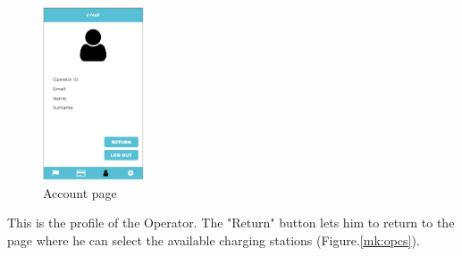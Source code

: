 \documentclass[../main.tex]{subfiles}
\begin{document}
\begin{figure}[!htb]
  \centering
  \begin{minipage}[b]{0.3\textwidth}
  \centering
    \includegraphics[width=30mm]{Mockups/mk_op_info.png}
    \caption{Account page}
    \label{fig:class}
  \end{minipage}
\end{figure}
\noindent
This is the profile of the Operator. The "Return" button lets him to return to the page where he can select the available charging stations (Figure.\ref{mk:opcs}).
\clearpage
\newpage
\end{document}
